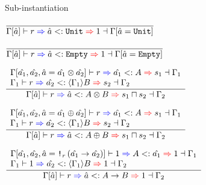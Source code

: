 \documentclass{beamer}
\begin{document}
\begin{frame}{Sub-instantiation}

\begin{center}
  $\infrule{}{\subinst{\holectx{\Gamma}{\evar{a}}}{r}{\evar{a}}{\Unit}{\One}{\holectx{\Gamma}{\evar{a}[\Unit]}}}$

  \vspace{1em}

  $\infrule{}{\subinst{\holectx{\Gamma}{\evar{a}}}{r}{\evar{a}}{\Empty}{\One}{\holectx{\Gamma}{\evar{a}[\Empty]}}}$

  \vspace{1em}

  $\infrule{\begin{array}{l} \subinst{\holectx{\Gamma}{\evar{a_1}, \evar{a_2}, \evar{a}[\Prod{\evar{a_1}}{\evar{a_2}}]}}{r}{\evar{a_1}}{A}{s_1}{\Gamma_1} \\ \subinst{\Gamma_1}{r}{\evar{a_2}}{\substctx{\Gamma_1}{B}}{s_2}{\Gamma_2} \end{array}}{\subinst{\holectx{\Gamma}{\evar{a}}}{r}{\evar{a}}{\Prod{A}{B}}{\glbqty{s_1}{s_2}}{\Gamma_2}}$

  \vspace{1em}

  $\infrule{\begin{array}{l} \subinst{\holectx{\Gamma}{\evar{a_1}, \evar{a_2}, \evar{a}[\Sum{\evar{a_1}}{\evar{a_2}}]}}{r}{\evar{a_1}}{A}{s_1}{\Gamma_1} \\ \subinst{\Gamma_1}{r}{\evar{a_2}}{\substctx{\Gamma_1}{B}}{s_2}{\Gamma_2} \end{array}}{\subinst{\holectx{\Gamma}{\evar{a}}}{r}{\evar{a}}{\Sum{A}{B}}{\glbqty{s_1}{s_2}}{\Gamma_2}}$

  \vspace{1em}

  $\infrule{\begin{array}{l} \superinst{\holectx{\Gamma}{\evar{a_1}, \evar{a_2}, \evar{a}[\Box[r]{(\Fun{\evar{a_1}}{\evar{a_2}})}]}}{\One}{A}{\evar{a_1}}{\One}{\Gamma_1} \\ \subinst{\Gamma_1}{\One}{\evar{a_2}}{\substctx{\Gamma_1}{B}}{\One}{\Gamma_2} \end{array}}{\subinst{\holectx{\Gamma}{\evar{a}}}{r}{\evar{a}}{\Fun{A}{B}}{\One}{\Gamma_2}}$
\end{center}

\end{frame}
\end{document}
